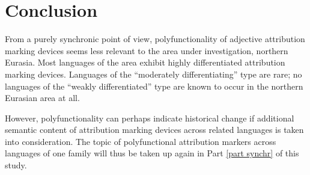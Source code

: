 \section{Conclusion}
From a purely synchronic point of view, polyfunctionality of adjective attribution marking devices seems less relevant to the area under investigation, northern Eurasia. Most languages of the area exhibit highly differentiated attribution marking devices. Languages of the “moderately differentiating” type are rare; no languages of the “weakly differentiated” type are known to occur in the northern Eurasian area at all.

However, polyfunctionality can perhaps indicate historical change if additional semantic content of attribution marking devices across related languages is taken into consideration. The topic of polyfunctional attribution markers across languages of one family will thus be taken up again in Part \ref{part synchr} of this study.
